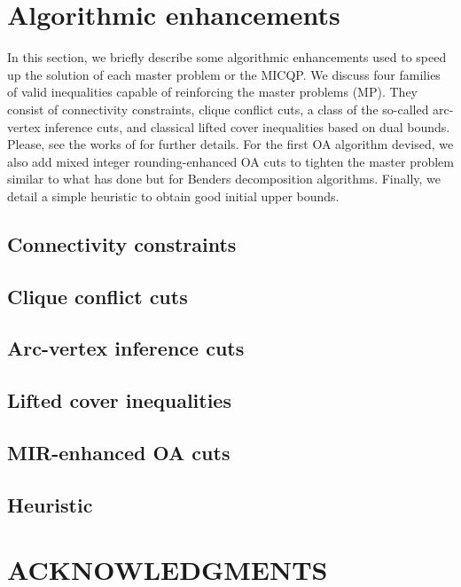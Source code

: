 \documentclass[num-refs]{wiley-networks}
\begin{document}
\section{Algorithmic enhancements}

In this section, we briefly describe some algorithmic enhancements used to speed
up the solution of each master problem or the MICQP.
We discuss four families of valid inequalities capable of
reinforcing the master problems (MP). They consist of connectivity
constraints, clique conflict cuts, a class of
the so-called arc-vertex inference cuts, and classical lifted cover
inequalities based on dual bounds. Please, see the works
of \cite{bianchessi2018,assuncao2021} for further details. 
For the first OA algorithm devised, we also add mixed integer rounding-enhanced OA cuts to tighten the master problem
similar to what \cite{bodur2017,liang2025} has done but for
Benders decomposition algorithms. Finally, we detail a simple heuristic
to obtain good initial upper bounds.

\subsection{Connectivity constraints}
\subsection{Clique conflict cuts}
\subsection{Arc-vertex inference cuts}
\subsection{Lifted cover inequalities}
\subsection{MIR-enhanced OA cuts}
\subsection{Heuristic}
%
\section*{\normalsize{ACKNOWLEDGMENTS}}


%

\end{document}
